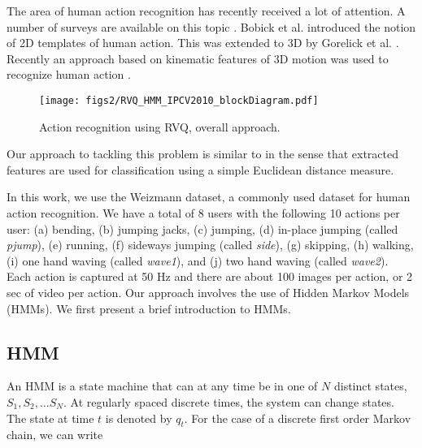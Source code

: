 \begin{Body}
The area of human action recognition has recently received a lot of attention.  A number of surveys are available on this topic \cite{1995_JNL_SURVEYmotion_Cedras, 1999_JNL_SURVEYmotion_Aggarwal, 1999_JNL_SURVEYmotion_Gavrila, 1999_REP_SURVEYmotion_Moeslund, 2001_JNL_SURVEYmotion_Moeslund, 2003_JNL_SURVEYiu_Buxton, 2003_JNL_SURVEYmotion_LWang, 2003_JNL_SURVEYbeh_Shah,2003_JNL_SURVEYaction_JWang, 2004_CNF_SURVEYaction_Aggarwal, 2004_JNL_SURVEYiu_Hu, 2004_CNF_SURVEYgait_Nixon, 2004_CNF_Survey3DshapeRetrieval, 2006_JNL_HumanMotion_Moeslund, 2007_JNL_HumanMotion_Poppe, 2008_CNF_SurveyHumanActivityRecognition_Ahad, 2010_JNL_SURVEYmotion_Ji}.  Bobick et al. \cite{2001_JNL_MotionTemplates_Bobick} introduced the notion of 2D templates of human action.  This was extended to 3D by Gorelick et al. \cite{2007_JNL_SpaceTimeShapes_Gorelick}.  Recently an approach based on kinematic features of 3D motion was used to recognize human action \cite{2010_JNL_ActionReconKinematic_Ali}.   

								\begin{figure}[t]
								\centering
								\texttt{[image: figs2/RVQ\_HMM\_IPCV2010\_blockDiagram.pdf]}
								\caption{Action recognition using RVQ, overall approach.}
								\label{fig:RVQ_HMM_IPCV2010_blockDiagram}
								\end{figure}


Our approach to tackling this problem is similar to \cite{2007_JNL_SpaceTimeShapes_Gorelick} in the sense that extracted features are used for classification using a simple Euclidean distance measure.  

In this work, we use the Weizmann dataset, a commonly used dataset for human action recognition.  We have a total of 8 users with the following 10 actions per user: (a) bending, (b) jumping jacks, (c) jumping, (d) in-place jumping (called \emph{pjump}), (e) running, (f) sideways jumping (called \emph{side}), (g) skipping, (h) walking, (i) one hand waving (called \emph{wave1}), and (j) two hand waving (called \emph{wave2}).  Each action is captured at 50 Hz and there are about 100 images per action, or 2 sec of video per action.  Our approach involves the use of Hidden Markov Models (HMMs).  We first present a brief introduction to HMMs.

\subsection{HMM}
An HMM is a state machine that can at any time be in one of $N$ distinct states, $S_1, S_2, \ldots S_N$.  At regularly spaced discrete times, the system can change states.  The state at time $t$ is denoted by $q_t$.  For the case of a discrete first order Markov chain, we can write


\end{Body}

